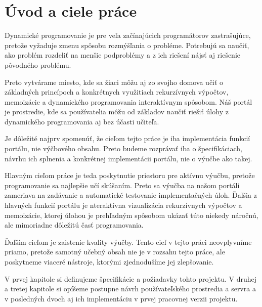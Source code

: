\chapter*{Úvod a ciele práce}
Dynamické programovanie je pre veľa začínajúcich programátorov zastrašujúce,
pretože vyžaduje zmenu spôsobu rozmýšľania o probléme. Potrebujú sa naučiť,
ako problém rozdeliť na menšie podproblémy a z ich riešení nájsť aj riešenie
pôvodného problému.

Preto vytvárame miesto, kde sa žiaci môžu aj zo svojho domova učiť o základných princípoch a
konkrétnych využitiach rekurzívnych výpočtov, memoizácie a dynamického programovania interaktívnym spôsobom.
Náš portál je prostredie, kde sa používatelia môžu od základov naučiť
riešiť úlohy z dynamického programovania aj bez účasti učiteľa.

Je dôležité najprv spomenúť, že cieľom tejto práce je iba implementácia funkcií portálu, nie výčbového
obsahu. Preto budeme rozprávať iba o špecifikáciach, návrhu ich splnenia a konkrétnej implementácii portálu,
nie o výučbe ako takej.

Hlavným cieľom práce je teda poskytnutie priestoru pre aktívnu výučbu,
pretože programovanie sa najlepšie učí skúšaním. Preto sa výučba na našom portáli zameriava na
zadávanie a automatické testovanie implementačných úloh. Ďalšia z hlavných funkcií portálu je
nteraktívna vizualizácia rekurzívnych výpočtov a memoizácie, ktorej úlohou je prehľadným spôsobom ukázať túto niekedy
náročnú, ale mimoriadne dôležitú časť programovania.

Ďaľším cieľom je zaistenie kvality výučby. Tento cieľ v tejto práci neovplyvníme
priamo, pretože samotný učebný obsah nie je v rozsahu tejto práce, ale poskytneme
viaceré nástroje, ktorými zjednodušíme jej zlepšovanie.

V prvej kapitole si definujeme špecifikácie a požiadavky tohto projektu.
V druhej a tretej kapitole si opíšeme postupne návrh používateľského prostredia a servra
a v posledných dvoch aj ich implementáciu v prvej pracovnej verzii projektu.
